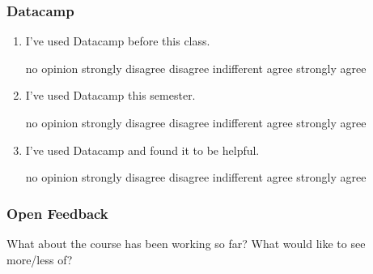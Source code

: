 \documentclass[10pt]{article}
\begin{document}
\subsubsection*{Datacamp}
\begin{enumerate}
	\item I've used Datacamp before this class.
	\begin{center}
		no opinion \qquad strongly disagree \qquad disagree \qquad indifferent \qquad agree \qquad strongly agree
	\end{center}
	\item I've used Datacamp this semester.
	\begin{center}
		no opinion \qquad strongly disagree \qquad disagree \qquad indifferent \qquad agree \qquad strongly agree
	\end{center}
	\item I've used Datacamp and found it to be helpful.
	\begin{center}
		no opinion \qquad strongly disagree \qquad disagree \qquad indifferent \qquad agree \qquad strongly agree
	\end{center}
\end{enumerate}

\subsubsection*{Open Feedback}

What about the course has been working so far? What would like to see more/less of?
\end{document}

